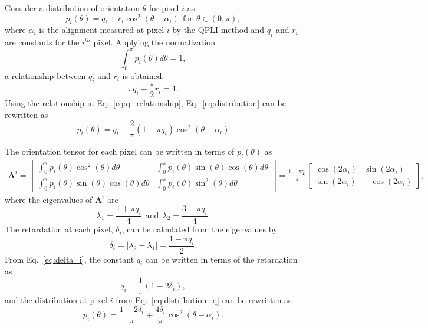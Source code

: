 \documentclass[]{interact}
\begin{document}
Consider a distribution of orientation $\theta$ for pixel $i$ as 
%
\begin{equation}
p_i(\theta) = q_i + r_i\cos^2(\theta - \alpha_i) \ \ \text{for} \ \ \theta \in (0,\pi),
\label{eq:distribution}
\end{equation}
%
where $\alpha_i$ is the alignment measured at pixel $i$ by the QPLI method and $q_i$ and $r_i$ are constants for the $i^{th}$ pixel. Applying the normalization 
%
\begin{equation}
\int_0^{\pi}p_i(\theta)d\theta = 1,
\end{equation}
%
a relationship between $q_i$ and $r_i$ is obtained:
%
\begin{equation}
\pi q_i + \frac{\pi}{2}r_i = 1.
\label{eq:q_relationship}
\end{equation}
%
Using the relationship in Eq.\ \eqref{eq:q_relationship}, Eq.\ \eqref{eq:distribution} can be rewritten as
%
\begin{equation}
p_i(\theta) = q_i + \frac{2}{\pi}(1-\pi q_i)\cos^2(\theta-\alpha_i)
\label{eq:distribution_q}
\end{equation}
%

The orientation tensor for each pixel can be written in terms of $p_i(\theta)$ as
%
\begin{eqnarray}
\pmb{A}^i = 
\begin{bmatrix}
\int_0^{\pi} p_i(\theta) \cos^2(\theta)d\theta & \int_0^{\pi} p_i(\theta) \sin(\theta) \cos(\theta)d\theta \\
\int_0^{\pi} p_i(\theta) \sin(\theta) \cos(\theta)d\theta & \int_0^{\pi} p_i(\theta) \sin^2(\theta)d\theta
\end{bmatrix} = 
%
\frac{1-\pi q_i}{4} 
\begin{bmatrix}
\cos(2 \alpha_i) & \sin(2 \alpha_i) \\
\sin(2\alpha_i) & - \cos(2\alpha_i)
\end{bmatrix},
\label{eq:Ai}
\end{eqnarray}
%
where the eigenvalues of $\pmb{A}^i$ are
\begin{equation}
\lambda_1 = \frac{1+\pi q_i}{4} \ \ \text{and} \ \ \lambda_2 = \frac{3-\pi q_i}{4}. 
\end{equation}
%
The retardation at each pixel, $\delta_i$, can be calculated from the eigenvalues by
%
\begin{equation}
\delta_i = |\lambda_2 - \lambda_1| = \frac{1-\pi q_i}{2}.
\label{eq:delta_i}
\end{equation}
%
From Eq.\ \eqref{eq:delta_i}, the constant $q_i$ can be written in terms of the retardation as
%
\begin{equation}
q_i = \frac{1}{\pi}(1-2\delta_i),
\end{equation}
%
and the distribution at pixel $i$ from Eq.\ \eqref{eq:distribution_q} can be rewritten as
%
\begin{equation}
p_i(\theta) = \frac{1-2\delta_i}{\pi} + \frac{4 \delta_i}{\pi}\cos^2(\theta-\alpha_i).
\label{eq:distribution_delta}
\end{equation}
%
\end{document}
